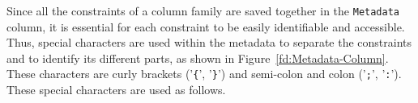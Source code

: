 Since all the  constraints of a column family are saved together in the
\texttt{Metadata} column,  it is essential for each constraint to be easily
identifiable and accessible.  Thus, special characters are used within the
metadata to separate the constraints and to identify its different parts, as
shown in Figure~\ref{fd:Metadata-Column}. These characters are curly brackets
('\texttt{\{}', '\texttt{\}}') and semi-colon and colon ('\texttt{;}',
'\texttt{:}'). These special characters are used as follows.



% 


	
